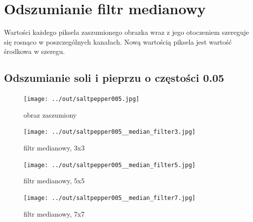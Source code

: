 \documentclass[a4paper,12pt]{article}
\begin{document}
\newpage
\section{Odszumianie filtr medianowy}
Wartości każdego piksela zaszumionego obrazka wraz z jego otoczeniem szereguje się rosnąco w poszczególnych kanałach. Nową wartością piksela jest wartość środkowa w szeregu.





\newpage
\subsection{Odszumianie soli i pieprzu o częstości 0.05}
\begin{figure}[h!]
\begin{minipage}[t]{7.5cm}
\begin{center}
\texttt{[image: ../out/saltpepper005.jpg]}
\caption{obraz zaszumiony}
\end{center}
\end{minipage}
\hfill
\begin{minipage}[t]{7.5cm}
\begin{center}
\texttt{[image: ../out/saltpepper005\_\_median\_filter3.jpg]}
\caption{filtr medianowy, 3x3}
\end{center}
\end{minipage}
\end{figure}

\begin{figure}[h!]
\begin{minipage}[t]{7.5cm}
\begin{center}
\texttt{[image: ../out/saltpepper005\_\_median\_filter5.jpg]}
\caption{filtr medianowy, 5x5}
\end{center}
\end{minipage}
\hfill
\begin{minipage}[t]{7.5cm}
\begin{center}
\texttt{[image: ../out/saltpepper005\_\_median\_filter7.jpg]}
\caption{filtr medianowy, 7x7}
\end{center}
\end{minipage}
\end{figure}


\newpage
\end{document}
